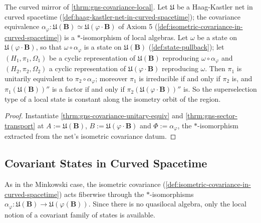 \begin{theorem}
    \label{thrm:gns-covariance-local-in-curved-spacetime}
    \leanok
    The curved mirror of \ref{thrm:gns-covariance-local}. Let $\mathfrak{U}$ be a Haag-Kastler net in curved spacetime (\ref{def:haag-kastler-net-in-curved-spacetime}); the covariance equivalence $\alpha_\varphi : \mathfrak{U}(\mathbf{B}) \simeq \mathfrak{U}(\varphi\cdot\mathbf{B})$ of Axiom 5 (\ref{def:isometric-covariance-in-curved-spacetime}) is a $*$-isomorphism of local algebras. Let $\omega$ be a state on $\mathfrak{U}(\varphi\cdot\mathbf{B})$, so that $\omega \circ \alpha_\varphi$ is a state on $\mathfrak{U}(\mathbf{B})$ (\ref{def:state-pullback}); let $(H_1, \pi_1, \Omega_1)$ be a cyclic representation of $\mathfrak{U}(\mathbf{B})$ reproducing $\omega \circ \alpha_\varphi$ and $(H_2, \pi_2, \Omega_2)$ a cyclic representation of $\mathfrak{U}(\varphi\cdot\mathbf{B})$ reproducing $\omega$. Then $\pi_1$ is unitarily equivalent to $\pi_2 \circ \alpha_\varphi$; moreover $\pi_1$ is irreducible if and only if $\pi_2$ is, and $\pi_1(\mathfrak{U}(\mathbf{B}))''$ is a factor if and only if $\pi_2(\mathfrak{U}(\varphi\cdot\mathbf{B}))''$ is. So the superselection type of a local state is constant along the isometry orbit of the region.
\end{theorem}
\begin{proof}
    \leanok
    Instantiate \ref{thrm:gns-covariance-unitary-equiv} and \ref{thrm:gns-sector-transport} at $A := \mathfrak{U}(\mathbf{B})$, $B := \mathfrak{U}(\varphi\cdot\mathbf{B})$ and $\Phi := \alpha_\varphi$, the $*$-isomorphism extracted from the net's isometric covariance datum.
\end{proof}

\subsection{Covariant States in Curved Spacetime}

As in the Minkowski case, the isometric covariance (\ref{def:isometric-covariance-in-curved-spacetime}) acts fiberwise through the $*$-isomorphisms $\alpha_\varphi : \mathfrak{U}(\mathbf{B}) \to \mathfrak{U}(\varphi(\mathbf{B}))$. Since there is no quasilocal algebra, only the local notion of a covariant family of states is available.


